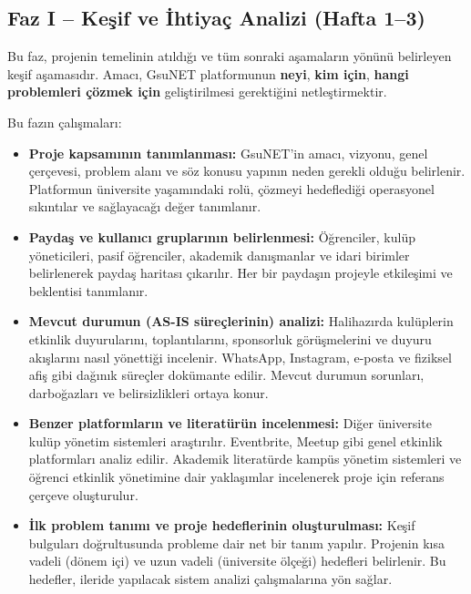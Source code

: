 \documentclass[a4paper,12pt]{report}
\begin{document}
\subsection{Faz I – Keşif ve İhtiyaç Analizi (Hafta 1–3)}

Bu faz, projenin temelinin atıldığı ve tüm sonraki aşamaların yönünü belirleyen keşif aşamasıdır. Amacı, GsuNET platformunun \textbf{neyi}, \textbf{kim için}, \textbf{hangi problemleri çözmek için} geliştirilmesi gerektiğini netleştirmektir.

Bu fazın çalışmaları:

\begin{itemize}
    \item \textbf{Proje kapsamının tanımlanması:} GsuNET'in amacı, vizyonu, genel çerçevesi, problem alanı ve söz konusu yapının neden gerekli olduğu belirlenir. Platformun üniversite yaşamındaki rolü, çözmeyi hedeflediği operasyonel sıkıntılar ve sağlayacağı değer tanımlanır.

    \item \textbf{Paydaş ve kullanıcı gruplarının belirlenmesi:} Öğrenciler, kulüp yöneticileri, pasif öğrenciler, akademik danışmanlar ve idari birimler belirlenerek paydaş haritası çıkarılır. Her bir paydaşın projeyle etkileşimi ve beklentisi tanımlanır.

    \item \textbf{Mevcut durumun (AS-IS süreçlerinin) analizi:} Halihazırda kulüplerin etkinlik duyurularını, toplantılarını, sponsorluk görüşmelerini ve duyuru akışlarını nasıl yönettiği incelenir. WhatsApp, Instagram, e-posta ve fiziksel afiş gibi dağınık süreçler dokümante edilir. Mevcut durumun sorunları, darboğazları ve belirsizlikleri ortaya konur.

    \item \textbf{Benzer platformların ve literatürün incelenmesi:} Diğer üniversite kulüp yönetim sistemleri araştırılır. Eventbrite, Meetup gibi genel etkinlik platformları analiz edilir. Akademik literatürde kampüs yönetim sistemleri ve öğrenci etkinlik yönetimine dair yaklaşımlar incelenerek proje için referans çerçeve oluşturulur.

    \item \textbf{İlk problem tanımı ve proje hedeflerinin oluşturulması:} Keşif bulguları doğrultusunda probleme dair net bir tanım yapılır. Projenin kısa vadeli (dönem içi) ve uzun vadeli (üniversite ölçeği) hedefleri belirlenir. Bu hedefler, ileride yapılacak sistem analizi çalışmalarına yön sağlar.
\end{itemize}
\end{document}
